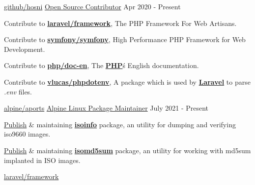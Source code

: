 
\begin{cventries}
	\cventry
		{\href{https://github.com/hosni}{github/hosni}} %
		{\href{https://github.com/pulls?q=author\%3Ahosni+-user\%3Ajalno+-user\%3Adnj+-user\%3Ajeyserver}{\faGithub\acvHeaderIconSep Open Source Contributor}} %
		{} %
		{Apr 2020 - Present} %
		{
			\begin{cvitems}
				\item Contribute to \textbf{\href{https://github.com/laravel/framework/commits/12.x/?author=hosni}{laravel/framework}}, The PHP Framework For Web Artisans.
				\item Contribute to \textbf{\href{https://github.com/symfony/symfony/commits/7.4/?author=hosni}{symfony/symfony}}, High Performance PHP Framework for Web Development.
				\item Contribute to \textbf{\href{https://github.com/php/doc-en/commits/master/?author=hosni}{php/doc-en}}, The \textbf{\href{https://php.net}{PHP}}\'s English documentation.
				\item Contribute to \textbf{\href{https://github.com/vlucas/phpdotenv/commits/master/?author=hosni}{vlucas/phpdotenv}}, A package which is used by \textbf{\href{https://github.com/laravel/framework/blob/e2fdcd734bbf4d7bf254faa17ad8ad601b6aa24b/composer.json\#L60}{Laravel}} to parse \textit{.env} files.
			\end{cvitems}
	}
	\cventry
		{\href{https://gitlab.alpinelinux.org/alpine/aports}{alpine/aports}} %
		{\href{https://gitlab.alpinelinux.org/alpine/aports}{\faGitlab\acvHeaderIconSep Alpine Linux Package Maintainer}} %
		{} %
		{July 2021 - Present} %
		{
			\begin{cvitems}
				\item {\href{https://gitlab.alpinelinux.org/alpine/aports/-/merge_requests/23549}{Publish} \& maintaining \textbf{\href{https://pkgs.alpinelinux.org/package/edge/testing/x86_64/isoinfo}{isoinfo}} package, an utility for dumping and verifying iso9660 images.}
				\item {\href{https://gitlab.alpinelinux.org/alpine/aports/-/merge_requests/23560}{Publish} \& maintaining \textbf{\href{https://pkgs.alpinelinux.org/package/edge/testing/x86_64/isomd5sum}{isomd5sum}} package, an utility for working with md5sum implanted in ISO images.}				
			\end{cvitems}
		}
	\cventry
		{\href{https://github.com/laravel/framework/commits/?author=hosni}{laravel/framework}} %

\end{cventries}
